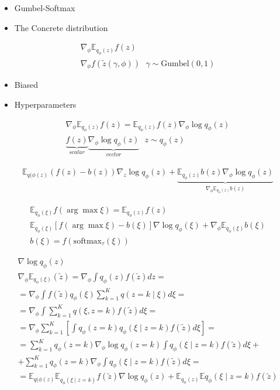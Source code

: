 \documentclass{book}
\begin{document}
\begin{itemize}
    \item Gumbel-Softmax
    \item The Concrete distribution
\end{itemize}

\begin{gather*}
    \nabla_\phi \mathbb{E}_{q_\phi(z)}f(z)\\
    \nabla_\phi f(\tilde{z}(\gamma,\phi))~~~\gamma\sim\mathrm{Gumbel}(0,1)
\end{gather*}

\begin{itemize}
    \item Biased
    \item Hyperparameters
\end{itemize}

\begin{gather*}
    \nabla_\phi\mathbb{E}_{q_\phi(z)}f(z)=\mathbb{E}_{q_\phi(z)}f(z)\nabla_\phi\log q_\phi(z)\\
    \underbrace{f(z)}_{scalar}\underbrace{\nabla_\phi\log q_\phi(z)}_{vector}~~~z\sim q_\phi(z)
\end{gather*}

\begin{gather*}
    \mathbb{E}_{q(\phi(z)}(f(z)-b(z))\nabla_z \log q_\phi(z)+\underbrace{\mathbb{E}_{q_\phi(z)}b(z)\nabla_\phi \log q_\phi(z)}_{\nabla_\phi \mathbb{E}_{q_\phi(z)}b(z)}
\end{gather*}

\begin{gather*}
    \mathbb{E}_{q_\phi(\xi)}f(\arg\max\xi)=\mathbb{E}_{q_\phi(z)}f(z)\\
    \mathbb{E}_{q_\phi(\xi)}[f(\arg\max\xi)-b(\xi)]\nabla\log q_\phi(\xi)+\nabla_\phi\mathbb{E}_{q_\phi(\xi)}b(\xi)\\
    b(\xi)=f(\mathrm{softmax}_\tau(\xi))
\end{gather*}

\begin{gather*}
    \nabla\log q_\phi(z)\\
    \nabla_\phi \mathbb{E}_{q_\phi(\xi)}(\tilde{z})=\nabla_\phi \int {q_\phi(z)f(\tilde{z})dz}=\\
    =\nabla_\phi \int {f(\tilde{z})q_\phi(\xi)\sum_{k=1}^{K} {q(z=k\mid \xi)}d\xi}=\\
    =\nabla_\phi \int {\sum_{k=1}^{K} {q(\xi,z=k)}f(\tilde{z})d\xi}=\\
    =\nabla_\phi \sum_{k=1}^{K} {\left[\int {q_\phi(z=k)q_\phi(\xi\mid z=k)f(\tilde{z})d\xi}\right]}=\\
    =\sum_{k=1}^{K} {q_\phi(z=k)\nabla_\phi \log q_\phi(z=k)\int {q_\phi(\xi\mid z=k)f(\tilde{z})d\xi}}+\\
    +\sum_{k=1}^{K} {q_\phi(z=k)\nabla_\phi \int {q_\phi(\xi\mid z=k)f(\tilde{z})d\xi}}=\\
    =\mathbb{E}_{q(\phi(z)}\mathbb{E}_{q_\phi(\xi\mid z=k)}f(\tilde{z})\nabla\log q_\phi(z)+\mathbb{E}_{q_\phi(z)}\mathbb{E}{q_\phi(\xi\mid z=k)}f(\tilde{z})
\end{gather*}
\end{document}
